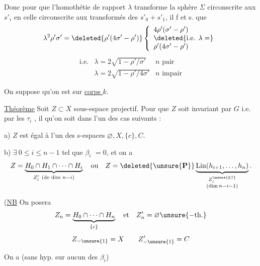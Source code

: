 Donc pour que l'homothétie de rapport $\lambda$ transforme la sphère
$\Sigma$ circonscrite aux $s'_i$ en celle circonscrite aux transformés des
$s'_0+s'_1$, il f et s. que
\[
\lambda^2\rho'\sigma'
=\deleted{\rho'(4\sigma'-\rho')}
\left\{\begin{array}{l}
4\rho'(\sigma'-\rho')\\
\deleted{\text{i.e. }\lambda=}\\
\rho'(4\sigma'-\rho')
\end{array}\right.
\]
\[
\begin{array}{lll}
\text{i.e.}&\lambda=2\sqrt{1-\rho'/\sigma'}&n\text{ pair}\\
&\lambda=2\sqrt{1-\rho'/4\sigma'}&n\text{ impair}
\end{array}
\]





On suppose qu'on est sur \uline{corps $k$}.


\uline{Théorème} Soit $Z\subset X$ sous-espace projectif. Pour que $Z$ soit invariant par $G$ i.e. par les $\tau_i$ , il  qu'on soit dans l'un des cas suivants :

a) $Z$ est égal à l'un des s-espaces $\varnothing,X,\{c\},C$.

b) $\exists\ 0\leq i\leq n-1$ tel que $\beta_i$  $=0$, et on a
\[
Z=\underbrace{H_0\cap H_1\cap\cdots\cap H_i}_{Z_i'\ (\text{de dim }n-i)}
\quad\text{ou}\quad
Z=\deleted{\unsure{\mathbf P}}\underbrace{\operatorname{Lin}(h_{i+1},\ldots,h_n)}_{\substack{Z_i^{\unsure{\sharp|!}}\\(\dim n-i-1)}}.
\]

(\uline{NB} On posera
\[
Z_n=\underbrace{H_0\cap\cdots\cap H_n}_{\{c\}}
\quad\text{et}\quad Z_n'=\varnothing\unsure{-\mathrm{th}.}
\]
\[
Z_{-\unsure{1}}=X\qquad Z_{-\unsure{1}}'=C
\]

On a (sans hyp. sur aucun des $\beta_i$)

